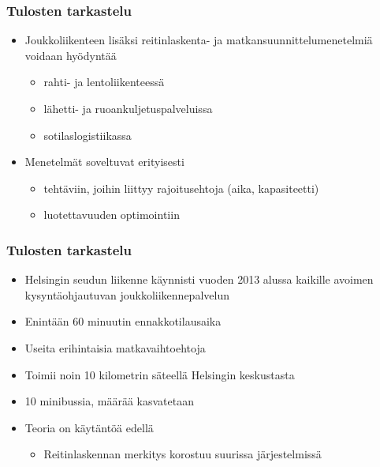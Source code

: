 \documentclass{beamer}
\begin{document}
\begin{frame}
  \frametitle{Tulosten tarkastelu}   %
\begin{itemize}
 \item 
Joukkoliikenteen lisäksi reitinlaskenta- ja matkansuunnittelumenetelmiä voidaan hyödyntää 
\begin{itemize}
\item
rahti- ja lentoliikenteessä
\item
lähetti- ja ruoankuljetuspalveluissa 
\item
sotilaslogistiikassa
 \end{itemize}
 \item
 Menetelmät soveltuvat erityisesti
 \begin{itemize}
  \item 
  tehtäviin, joihin liittyy rajoitusehtoja (aika, kapasiteetti)
  \item
  luotettavuuden optimointiin
 \end{itemize}
 \end{itemize}
\end{frame}



\begin{frame}
  \frametitle{Tulosten tarkastelu}   %
\begin{itemize}
 \item 
Helsingin seudun liikenne käynnisti vuoden 2013 alussa kaikille avoimen kysyntäohjautuvan joukkoliikennepalvelun
\item
Enintään 60 minuutin ennakkotilausaika
\item
Useita erihintaisia matkavaihtoehtoja
\item
Toimii noin 10 kilometrin säteellä Helsingin keskustasta
\item
10 minibussia, määrää kasvatetaan
\item
Teoria on käytäntöä edellä
\begin{itemize}
 \item 
 Reitinlaskennan merkitys korostuu suurissa järjestelmissä
\end{itemize}
 \end{itemize}
\end{frame}
\end{document}
